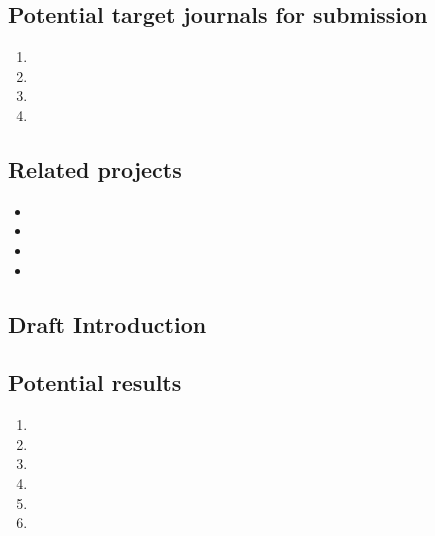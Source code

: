 \documentclass[11pt,letterpaper]{article}
\begin{document}
\subsection{Potential target journals for submission}
\label{sec:org3213b54}

\begin{enumerate}
\item 

\item 

\item 

\item 
\end{enumerate}




\subsection{Related projects}
\label{sec:orgb8ff194}


\begin{itemize}
\item 

\item 

\item 

\item 
\end{itemize}

\subsection{Draft Introduction}
\label{sec:org1ff72e5}



\subsection{Potential results}
\label{sec:orgba34895}


\begin{enumerate}
\item 

\item 

\item 

\item 

\item 

\item 
\end{enumerate}
\end{document}
